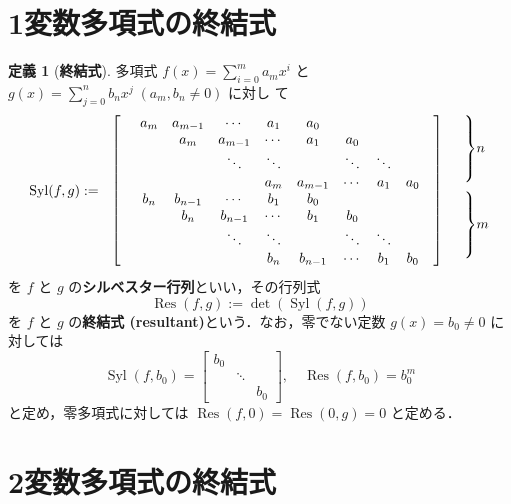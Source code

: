 \documentclass[12pt, uplatex, dvipdfmx]{jsarticle}
\newcommand{\ds}{\displaystyle}
\theoremstyle{definition}
\newtheorem*{definition}{定義}
\DeclareMathOperator{\Syl}{Syl}
\DeclareMathOperator{\Res}{Res}
\begin{document}
\section{1変数多項式の終結式}

\begin{definition}[\textbf{終結式}]
  多項式 $\ds f(x) = \sum_{i=0}^{m}a_m x^i$ と $\ds g(x) = \sum_{j=0}^{n} b_n x^j \; (a_m, b_n \neq 0)$ に対し
  て
  \[
    \Syl(f,g):=
    \begin{array}{rccccccccll}
      \ldelim[{9}{12pt}[] &  a_m & a_{m-1} & \cdots & a_1 & a_0 & & & & \rdelim]{9}{12pt}[] & \rdelim\}{4}{14pt}[\(n\)]\\
                          &  & a_m & a_{m-1} & \cdots & a_1 & a_0& & & &\\
                          &  & & \ddots & \ddots & & \ddots & \ddots & & & \\
                          &  & & & a_m & a_{m-1} & \cdots & a_1 & a_0 & &\\
                          & b_n & b_{n-1} & \cdots & b_1 & b_0 & & & & &  \rdelim\}{4}{14pt}[\(m\)]\\
                          & & b_n & b_{n-1} & \cdots & b_1 & b_0 & & & & \\
                          & & & \ddots & \ddots & & \ddots & \ddots & & &\\
                          & & & & b_n & b_{n-1} & \cdots & b_1 & b_0 & &
    \end{array}
  \]
  を $f$ と $g$ の\textbf{シルベスター行列}といい，その行列式
  \[
    \Res(f,g):= \det(\Syl(f,g))
  \]
  を $f$ と $g$ の\textbf{終結式 (resultant)}という．なお，零でない定数 $g(x) = b_0 \neq 0$ に対しては
  \[
    \Syl(f, b_0) =\left[
    \begin{array}{ccc}
       b_0  & & \\
            & \ddots & \\
            & & b_0 
    \end{array}
  \right], \quad \Res(f, b_0) = b_0^m
  \]
  と定め，零多項式に対しては $\Res(f,0) = \Res(0,g)=0$ と定める．
\end{definition}



\newpage

\section{2変数多項式の終結式}
\end{document}
